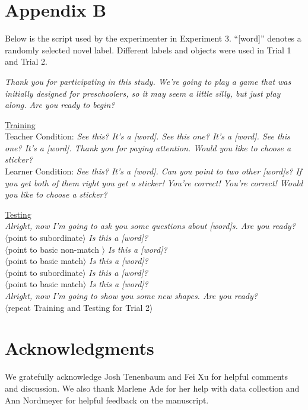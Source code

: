 \documentclass[man]{apa2}
\begin{document}
\section{Appendix B}
Below is the script used by the experimenter in Experiment 3. ``[word]'' denotes a randomly selected novel label. Different labels and objects were used in Trial 1 and Trial 2. 

\vspace{5mm}

{\it Thank you for participating in this study. We're going to play a game that was initially designed for preschoolers, so it may seem a little silly, but just play along. Are you ready to begin?}
\vspace{2.5mm}

\noindent \underline{Training} \\
	Teacher Condition: {\it See this? It's a [word]. See this one? It's a [word]. See this one? It's a [word]. Thank you for paying attention. Would you like to choose a sticker? }
\\
Learner Condition: {\it See this? It's a [word]. Can you point to two other [word]s? If you get both of them right you get a sticker! You're correct! You're correct! Would you like to choose a sticker? }
\vspace{2.5mm}
 
\noindent \underline{Testing} \\
{\it Alright, now I'm going to ask you some questions about [word]s. Are you ready?} \\
$\langle$point to subordinate$\rangle$ {\it Is this a [word]?} \\
$\langle$point to basic non-match $\rangle$ {\it Is this a [word]?} \\
$\langle$point to basic match$\rangle$ {\it Is this a [word]?}\\
$\langle$point to subordinate$\rangle$ {\it Is this a [word]?} \\
$\langle$point to basic match$\rangle$ {\it Is this a [word]?} \\
 
{\it Alright, now I'm going to show you some new shapes. Are you ready?}\\

\vspace{2.5mm}
\noindent $\langle$repeat Training and Testing for Trial 2$\rangle$ \\

\nocite{re2013}
\nocite{sanchez2003effect}

\section{Acknowledgments}

We gratefully acknowledge Josh Tenenbaum and Fei Xu for helpful comments and discussion. We also thank Marlene Ade for her help with data collection and Ann Nordmeyer for helpful feedback on the manuscript. 





\newpage
\theappendix 
\end{document}
